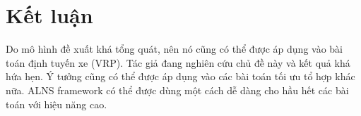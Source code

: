 \chapter{Kết luận}

Do mô hình đề xuất khá tổng quát, nên nó cũng có thể được áp dụng vào bài toán định tuyến xe (VRP). Tác giả đang nghiên cứu chủ đề này và kết quả khá hứa hẹn. Ý tưởng cũng có thể được áp dụng vào các bài toán tối ưu tổ hợp khác nữa. ALNS framework có thể được dùng một cách dễ dàng cho hầu hết các bài toán với hiệu năng cao. 
